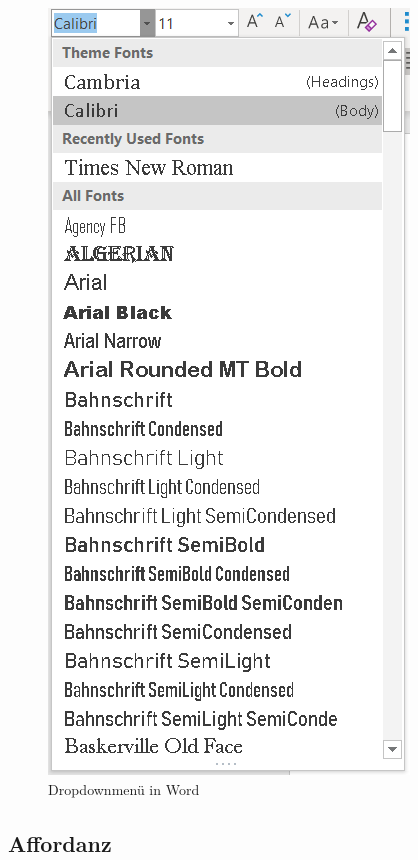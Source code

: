 \begin{figure}[H]
\begin{center}
  \includegraphics[scale = 0.5]{figures/Dropdown.PNG}
  \caption{Dropdownmenü in Word}
  \label{fig:Dropdown}
\end{center}
\end{figure}


\subsection*{Affordanz}

